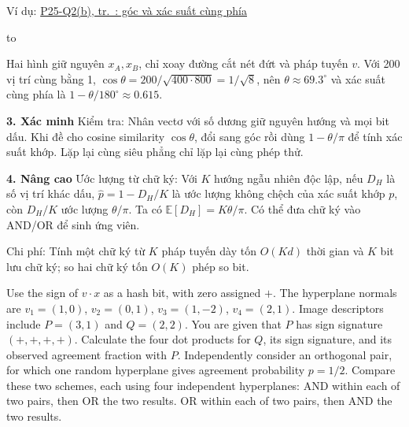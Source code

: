 \documentclass[10pt,a4paper,twocolumn]{article}
\newcommand{\key}[1]{#1:\enspace}
\newcommand{\blocklabel}[1]{\par\noindent#1\par\nobreak}
\newcommand{\qlink}[2]{\hyperref[question:#1]{#2}}
\newenvironment{example}[2]{%
  \par\addvspace{6pt}\noindent
  \raggedright
  \blocklabel{Ví dụ: \qlink{#1}{#2}}%
}{\par\addvspace{4pt}}
\newenvironment{diagram}{%
  \par\addvspace{3pt}\noindent\hbox to \linewidth\bgroup\hfil
}{\hfil\egroup\par\addvspace{3pt}}
\newcommand{\unitheading}[2]{%
  \par\addvspace{1pt}\noindent\textbf{#1. #2}\enspace}
\newcommand{\unitverification}{\unitheading{3}{Xác minh}}
\newcommand{\unitadvanced}{\unitheading{4}{Nâng cao}}
\begin{document}
\begin{example}{P25-Q2b}{P25-Q2(b), tr.~\pageref*{question:P25-Q2b}: góc và xác suất cùng phía}
\begin{diagram}
\end{diagram}
Hai hình giữ nguyên $x_A,x_B$, chỉ xoay đường cắt nét đứt và pháp tuyến $v$. Với 200 vị trí cùng bằng 1, $\cos\theta=200/\sqrt{400\cdot800}=1/\sqrt8$, nên $\theta\approx69.3^\circ$ và xác suất cùng phía là $1-\theta/180^\circ\approx0.615$.
\end{example}

\unitverification
\key{Kiểm tra} Nhân vectơ với số dương giữ nguyên hướng và mọi bit dấu. Khi đề cho cosine similarity $\cos\theta$, đổi sang góc rồi dùng $1-\theta/\pi$ để tính xác suất khớp. Lặp lại cùng siêu phẳng chỉ lặp lại cùng phép thử.

\unitadvanced
\key{Ước lượng từ chữ ký} Với $K$ hướng ngẫu nhiên độc lập, nếu $D_H$ là số vị trí khác dấu, $\hat p=1-D_H/K$ là ước lượng không chệch của xác suất khớp $p$, còn $D_H/K$ ước lượng $\theta/\pi$. Ta có $\mathbb E[D_H]=K\theta/\pi$. Có thể đưa chữ ký vào AND/OR để sinh ứng viên.

\key{Chi phí} Tính một chữ ký từ $K$ pháp tuyến dày tốn $O(Kd)$ thời gian và $K$ bit lưu chữ ký; so hai chữ ký tốn $O(K)$ phép so bit.

Use the sign of $v\cdot x$ as a hash bit, with zero assigned $+$. The hyperplane normals are $v_1=(1,0)$, $v_2=(0,1)$, $v_3=(1,-2)$, $v_4=(2,1)$. Image descriptors include $P=(3,1)$ and $Q=(2,2)$. You are given that $P$ has sign signature $(+,+,+,+)$.
 Calculate the four dot products for $Q$, its sign signature, and its observed agreement fraction with $P$.
 Independently consider an orthogonal pair, for which one random hyperplane gives agreement probability $p=1/2$. Compare these two schemes, each using four independent hyperplanes:
 AND within each of two pairs, then OR the two results.
 OR within each of two pairs, then AND the two results.
\end{document}
